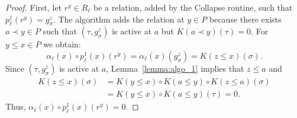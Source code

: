 \documentclass[english,a4paper,nolineno,cleveref]{socg-lipics-v2021}
\begin{document}
\begin{proof}
First, let $r^y\in R_\ell$ be a relation, added by the {\sc Collapse} routine, such that $p_\ell^1(r^y)=g^z_\sigma$. The algorithm adds the relation at $y\in P$ because there exists $a\prec y\in P$ such that $(\tau,g^z_\sigma)$ is active at $a$ but $K(a\prec y)(\tau)=0$. For $y\leq x\in P$ we obtain:
\begin{equation*}
\alpha_\ell(x)\circ p_\ell^1(x)(r^y)=\alpha_\ell(x)(g^z_\sigma)=K(z\leq x)(\sigma).    
\end{equation*}
Since $(\tau,g^z_\sigma)$ is active at $a$, Lemma~\ref{lemma:algo_1} implies that $z\leq a$ and 
\begin{equation*}
\begin{aligned}
K(z\leq x)(\sigma)&=K(y\leq x)\circ K(a\leq y)\circ K(z\leq a)(\sigma)\\ &=K(y\leq x)\circ K(a\leq y)(\tau)=0 .
\end{aligned}
\end{equation*}
Thus, $\alpha_\ell(x)\circ p_\ell^1(x)(r^y)=0$. 


\end{proof}
\end{document}
